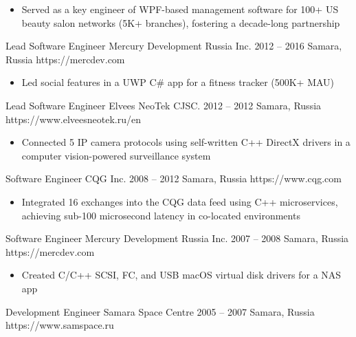 \begin{paracol}{2}
        \begin{itemize}
            \item Served as a key engineer of WPF-based management software
                  for 100+ US beauty salon networks (5K+ branches),
                  fostering a decade-long partnership
        \end{itemize}

    \cvLeftEvent%
        {Lead Software Engineer}
        {Mercury Development Russia Inc.}
        {2012 -- 2016}
        {Samara, Russia}
        {https://mercdev.com}

        \begin{itemize}
            \item Led social features in a UWP C\# app for a fitness tracker (500K+ MAU)
        \end{itemize}

    \cvLeftEvent%
        {Lead Software Engineer}
        {Elvees NeoTek CJSC.}
        {2012 -- 2012}
        {Samara, Russia}
        {https://www.elveesneotek.ru/en}

        \begin{itemize}
            \item Connected 5 IP camera protocols using self-written C++ DirectX drivers
                  in a computer vision-powered surveillance system
        \end{itemize}

    \cvLeftEvent%
        {Software Engineer}
        {CQG Inc.}
        {2008 -- 2012}
        {Samara, Russia}
        {https://www.cqg.com}

        \begin{itemize}
            \item Integrated 16 exchanges into the CQG data feed using C++ microservices,
                  achieving sub-100 microsecond latency in co-located environments
        \end{itemize}

    \cvLeftEvent%
        {Software Engineer}
        {Mercury Development Russia Inc.}
        {2007 -- 2008}
        {Samara, Russia}
        {https://mercdev.com}

        \begin{itemize}
            \item Created C/C++ SCSI, FC, and USB macOS virtual disk drivers for a NAS app
        \end{itemize}

    \cvLeftEvent%
        {Development Engineer}
        {Samara Space Centre}
        {2005 -- 2007}
        {Samara, Russia}
        {https://www.samspace.ru}


\end{paracol}
